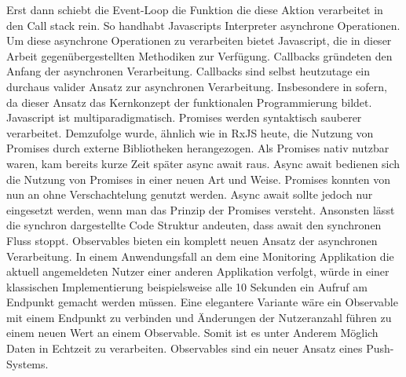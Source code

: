 \noindent
Erst dann schiebt die Event-Loop die Funktion die diese Aktion verarbeitet in den Call stack rein. So handhabt Javascripts Interpreter asynchrone Operationen. Um diese asynchrone Operationen zu verarbeiten bietet Javascript, die in dieser Arbeit gegenübergestellten Methodiken zur Verfügung. Callbacks gründeten den Anfang der asynchronen Verarbeitung. Callbacks sind selbst heutzutage ein durchaus valider Ansatz zur asynchronen Verarbeitung. Insbesondere in sofern, da dieser Ansatz das Kernkonzept der funktionalen Programmierung bildet. Javascript ist multiparadigmatisch. Promises werden syntaktisch \glqq sauberer\grqq{} verarbeitet. Demzufolge wurde, ähnlich wie in RxJS heute, die Nutzung von Promises durch externe Bibliotheken herangezogen. Als Promises nativ nutzbar waren, kam bereits kurze Zeit später async await raus. Async await bedienen sich die Nutzung von Promises in einer neuen Art und Weise. Promises konnten von nun an ohne Verschachtelung genutzt werden. Async await sollte jedoch nur eingesetzt werden, wenn man das Prinzip der Promises versteht. Ansonsten lässt die synchron dargestellte Code Struktur andeuten, dass await den synchronen Fluss stoppt. Observables bieten ein komplett neuen Ansatz der asynchronen Verarbeitung. In einem Anwendungsfall an dem eine Monitoring Applikation die aktuell angemeldeten Nutzer einer anderen Applikation verfolgt, würde in einer klassischen Implementierung beispielsweise alle 10 Sekunden ein Aufruf am Endpunkt gemacht werden müssen. Eine elegantere Variante wäre ein Observable mit einem Endpunkt zu verbinden und Änderungen der Nutzeranzahl führen zu einem neuen Wert an einem Observable. Somit ist es unter Anderem Möglich Daten in Echtzeit zu verarbeiten. Observables sind ein neuer Ansatz eines Push-Systems.
